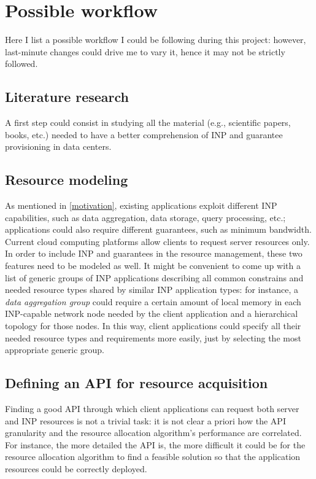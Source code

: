 \documentclass[letterpaper,twocolumn,10pt]{article}
\begin{document}
\section{Possible workflow}
Here I list a possible workflow I could be following during this project: however, last-minute changes could drive me to vary it, hence it may not be strictly followed.
\subsection{Literature research}
A first step could consist in studying all the material (e.g., scientific papers, books, etc.) needed to have a better comprehension of INP and guarantee provisioning in data centers.
\subsection{Resource modeling}
As mentioned in \autoref{motivation}, existing applications exploit different INP capabilities, such as data aggregation, data storage, query processing, etc.; applications could also require different guarantees, such as minimum bandwidth.
Current cloud computing platforms allow clients to request server resources only. In order to include INP and guarantees in the resource management, these two features need to be modeled as well.
It might be convenient to come up with a list of generic groups of INP applications describing all common constrains and needed resource types shared by similar INP application types: for instance, a \textit{data aggregation group} could require a certain amount of local memory in each INP-capable network node needed by the client application and a hierarchical topology for those nodes.
In this way, client applications could specify all their needed resource types and requirements more easily, just by selecting the most appropriate generic group.
\subsection{Defining an API for resource acquisition}
Finding a good API through which client applications can request both server and INP resources is not a trivial task: it is not clear a priori how the API granularity and the resource allocation algorithm's performance are correlated. For instance, the more detailed the API is, the more difficult it could be for the resource allocation algorithm to find a feasible solution so that the application resources could be correctly deployed.
\end{document}

